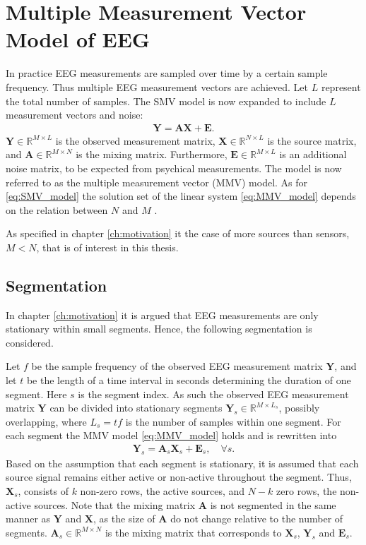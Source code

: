 \section{Multiple Measurement Vector Model of EEG}\label{sec:MMV}
In practice EEG measurements are sampled over time by a certain sample frequency. 
Thus multiple EEG measurement vectors are achieved.
Let $L$ represent the total number of samples. 
The SMV model is now expanded to include $L$ measurement vectors and noise:
\begin{align}\label{eq:MMV_model}
\mathbf{Y} = \mathbf{AX}+\textbf{E}.
\end{align}
$\mathbf{Y} \in \mathbb{R}^{M \times L}$ is the observed measurement matrix, $\mathbf{X} \in \mathbb{R}^{N \times L}$ is the source matrix, and $\mathbf{A} \in \mathbb{R}^{M \times N}$ is the mixing matrix. 
Furthermore, $\mathbf{E} \in \mathbb{R}^{M \times L}$ is an additional noise matrix, to be expected from psychical measurements.  
The model is now referred to as the multiple measurement vector (MMV) model.
As for \eqref{eq:SMV_model} the solution set of the linear system \eqref{eq:MMV_model} depends on the relation between $N$ and $M$ \cite[p. 42]{CS}. 

As specified in chapter \ref{ch:motivation} it the case of more sources than sensors, $M < N$, that is of interest in this thesis.  

\subsection{Segmentation}\label{seg_segmentation}
In chapter \ref{ch:motivation} it is argued that EEG measurements are only stationary within small segments. 
Hence, the following segmentation is considered.

Let $f$ be the sample frequency of the observed EEG measurement matrix $\mathbf{Y}$, and let $t$ be the length of a time interval in seconds determining the duration of one segment. 
Here $s$ is the segment index. 
As such the observed EEG measurement matrix $\mathbf{Y}$ can be divided into stationary segments $\mathbf{Y}_s \in \mathbb{R}^{M \times L_{s}}$, possibly overlapping, where $L_s = t f$ is the number of samples within one segment. 
For each segment the MMV model \eqref{eq:MMV_model} holds and is rewritten into
\begin{align}\label{eq:MMV_seg}
\mathbf{Y}_s = \textbf{A}_s\mathbf{X}_s + \textbf{E}_s, \quad \forall s.
\end{align}
Based on the assumption that each segment is stationary, it is assumed that each source signal remains either active or non-active throughout the segment.
Thus, $\mathbf{X}_s$, consists of $k$ non-zero rows, the active sources, and $N - k$ zero rows, the non-active sources.
Note that the mixing matrix $\mathbf{A}$ is not segmented in the same manner as $\mathbf{Y}$ and $\mathbf{X}$, as the size of $\mathbf{A}$ do not change relative to the number of segments. $\mathbf{A}_s\in \mathbb{R}^{M \times N}$ is the mixing matrix that corresponds to $\mathbf{X}_s$, $\mathbf{Y}_s$ and $\mathbf{E}_s$.

